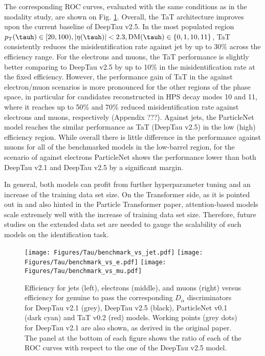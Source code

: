 The corresponding ROC curves, evaluated with the same conditions as in the modality study, are shown on Fig. \ref{fig:benchmark}. Overall, the TaT architecture improves upon the current baseline of DeepTau v2.5. In the most populated region $p_\text{T}(\tauh) \in [20,100), |\eta(\tauh)| < 2.3, \text{DM}(\tauh) \in \{0,1,10,11\}$, TaT consistently reduces the misidentification rate against jet by up to 30\% across the \tauh efficiency range. For the electrons and muons, the TaT performance is slightly better comparing to DeepTau v2.5 by up to 10\% in the misidentification rate at the fixed \tauh efficiency. However, the performance gain of TaT in the against electron/muon scenarios is more pronounced for the other regions of the phase space, in particular for \tauh candidates reconstructed in HPS decay modes 10 and 11, where it reaches up to 50\% and 70\% reduced misidentification rate against electrons and muons, respectively (Appendix ???). Against jets, the ParticleNet model reaches the similar performance as TaT (DeepTau v2.5) in the low (high) \tauh efficiency region. While overall there is little difference in the performance against muons for all of the benchmarked models in the low-\pt barrel region, for the scenario of against electrons ParticleNet shows the performance lower than both DeepTau v2.1 and DeepTau v2.5 by a significant margin.

In general, both models can profit from further hyperparameter tuning and an increase of the training data set size. On the Transformer side, as it is pointed out in \cite{hoffmann2022training} and also hinted in the Particle Transformer paper, attention-based models scale extremely well with the increase of training data set size. Therefore, future studies on the extended data set are needed to gauge the scalability of such models on the \tauh identification task.

\begin{figure}[t!]
    \centering
    \texttt{[image: Figures/Tau/benchmark\_vs\_jet.pdf]}
    \texttt{[image: Figures/Tau/benchmark\_vs\_e.pdf]}
    \texttt{[image: Figures/Tau/benchmark\_vs\_mu.pdf]}
    \caption{Efficiency for jets (left), electrons (middle), and muons (right) versus efficiency for genuine \tauh to pass the corresponding $D_\alpha$ discriminators for DeepTau v2.1 (grey), DeepTau v2.5 (black), ParticleNet v0.1 (dark cyan) and TaT v0.2 (red) models. Working points (grey dots) for DeepTau v2.1 are also shown, as derived in the original paper. The panel at the bottom of each figure shows the ratio of each of the ROC curves with respect to the one of the DeepTau v2.5 model.}
    \label{fig:benchmark}
\end{figure}

